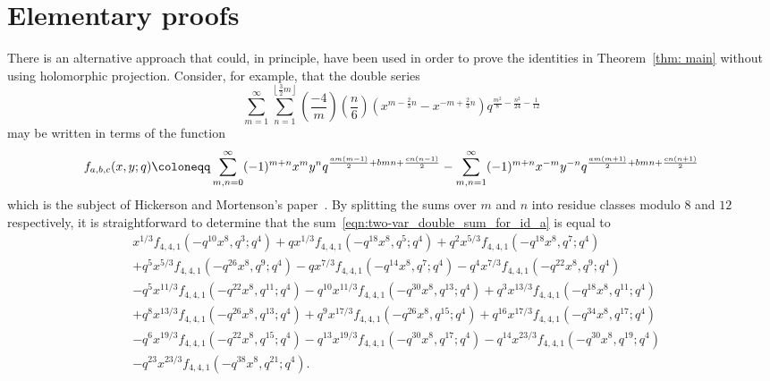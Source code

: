 \documentclass[11pt,reqno]{amsart}
\renewcommand{\=}{\;=\;}
\theoremstyle{myremark}
\begin{document}
\newpage
\section{\textbf{Elementary proofs}}
\label{sec:eleproofs}

There is an alternative approach that could, in principle, have been used in order to prove the identities in Theorem~\ref{thm: main} without using holomorphic projection. Consider, for example, that the double series
\begin{equation} \label{eqn:two-var_double_sum_for_id_a}
\sum_{m=1}^\infty \sum_{n=1}^{\left\lfloor \frac{3}{2}m \right\rfloor} \left(\frac{-4}{m}\right) \left(\frac{n}{6}\right) \left(x^{m-\frac{2}{3}n} - x^{-m+\frac{2}{3}n} \right) q^{\frac{m^2}{8}-\frac{n^2}{24}-\frac{1}{12}}
\end{equation}
may be written in terms of the function
\[ f_{a,b,c}(x,y;q)\coloneqq \sum_{m,n=0}^\infty (-1)^{m+n} x^m y^n q^{{am(m-1) \over 2} + bmn + {cn(n-1) \over 2}} - \sum_{m,n=1}^\infty (-1)^{m+n} x^{-m} y^{-n} q^{{am(m+1) \over 2} + bmn + {cn(n+1) \over 2}} \]
which is the subject of Hickerson and Mortenson's paper~\cite{Hickerson2014}. By splitting the sums over $m$ and $n$ into residue classes modulo $8$ and $12$ respectively, it is straightforward to determine that the sum~\eqref{eqn:two-var_double_sum_for_id_a} is equal to
\begin{align*}
&x^{1/3} f_{4,4,1}\left(-q^{10} x^8,q^3;q^4\right)
+q x^{1/3} f_{4,4,1}\left(-q^{18} x^8,q^5;q^4\right)
+q^2 x^{5/3} f_{4,4,1}\left(-q^{18} x^8,q^7;q^4\right) \\
&+q^5 x^{5/3} f_{4,4,1}\left(-q^{26} x^8,q^9;q^4\right)
-q x^{7/3} f_{4,4,1}\left(-q^{14} x^8,q^7;q^4\right)
-q^4 x^{7/3} f_{4,4,1}\left(-q^{22} x^8,q^9;q^4\right) \\
&-q^5 x^{11/3} f_{4,4,1}\left(-q^{22} x^8,q^{11};q^4\right)
-q^{10} x^{11/3} f_{4,4,1}\left(-q^{30} x^8,q^{13};q^4\right)
+q^3 x^{13/3} f_{4,4,1}\left(-q^{18}x^8,q^{11};q^4\right) \\
&+q^8 x^{13/3} f_{4,4,1}\left(-q^{26} x^8,q^{13};q^4\right)
+q^9 x^{17/3} f_{4,4,1}\left(-q^{26} x^8,q^{15};q^4\right)
+q^{16} x^{17/3} f_{4,4,1}\left(-q^{34} x^8,q^{17};q^4\right) \\
&-q^6 x^{19/3} f_{4,4,1}\left(-q^{22} x^8,q^{15};q^4\right)
-q^{13} x^{19/3} f_{4,4,1}\left(-q^{30} x^8,q^{17};q^4\right)
-q^{14} x^{23/3} f_{4,4,1}\left(-q^{30} x^8,q^{19};q^4\right) \\
&-q^{23}x^{23/3} f_{4,4,1}\left(-q^{38}x^8,q^{21};q^4\right).
\end{align*}
\end{document}
